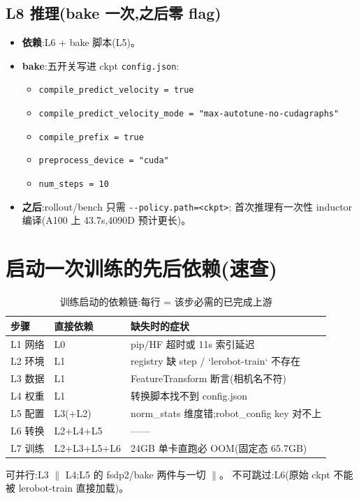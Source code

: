 \documentclass[11pt]{ctexart}
\begin{document}
\subsection{L8 推理(bake 一次,之后零 flag)}
\begin{itemize}
\item \textbf{依赖}:L6 + bake 脚本(L5)。
\item \textbf{bake}:五开关写进 ckpt \texttt{config.json}:
\begin{itemize}[itemsep=0pt,topsep=1pt,parsep=0pt]
\item \texttt{compile\_predict\_velocity = true}
\item \texttt{compile\_predict\_velocity\_mode = "max-autotune-no-cudagraphs"}
\item \texttt{compile\_prefix = true}
\item \texttt{preprocess\_device = "cuda"}
\item \texttt{num\_steps = 10}
\end{itemize}
\item \textbf{之后}:rollout/bench 只需 \texttt{-{}-policy.path=<ckpt>};
首次推理有一次性 inductor 编译(A100 上 43.7s,4090D 预计更长)。
\end{itemize}

\section{启动一次训练的先后依赖(速查)}
\begin{table}[htbp]
\centering\footnotesize
\caption{训练启动的依赖链:每行 = 该步必需的已完成上游}
\begin{tabular}{@{}llp{6.8cm}@{}}
\toprule
步骤 & 直接依赖 & 缺失时的症状 \\
\midrule
L1 网络 & L0 & pip/HF 超时或 11s 索引延迟 \\
L2 环境 & L1 & registry 缺 step / `lerobot-train` 不存在 \\
L3 数据 & L1 & FeatureTransform 断言(相机名不符) \\
L4 权重 & L1 & 转换脚本找不到 config.json \\
L5 配置 & L3(+L2) & norm\_stats 维度错;robot\_config key 对不上 \\
L6 转换 & L2+L4+L5 & —— \\
L7 训练 & L2+L3+L5+L6 & 24GB 单卡直跑必 OOM(固定态 65.7GB) \\
\bottomrule
\end{tabular}
\end{table}

可并行:L3 $\parallel$ L4;L5 的 fsdp2/bake 两件与一切 $\parallel$。
不可跳过:L6(原始 ckpt 不能被 lerobot-train 直接加载)。
\end{document}

